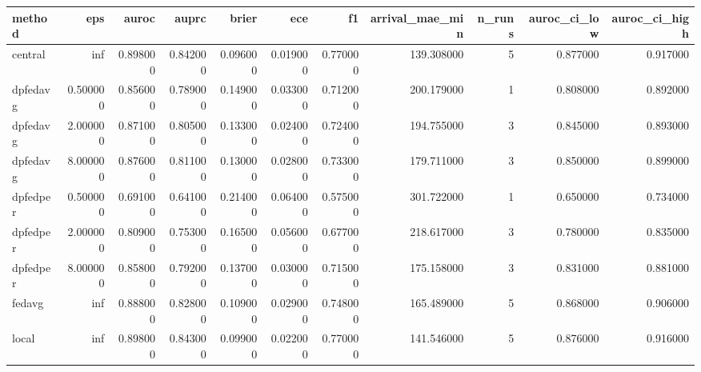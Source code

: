 \begin{tabular}{lrrrrrrrrrr}
\toprule
method & eps & auroc & auprc & brier & ece & f1 & arrival_mae_min & n_runs & auroc_ci_low & auroc_ci_high \\
\midrule
central & inf & 0.898000 & 0.842000 & 0.096000 & 0.019000 & 0.770000 & 139.308000 & 5 & 0.877000 & 0.917000 \\
dpfedavg & 0.500000 & 0.856000 & 0.789000 & 0.149000 & 0.033000 & 0.712000 & 200.179000 & 1 & 0.808000 & 0.892000 \\
dpfedavg & 2.000000 & 0.871000 & 0.805000 & 0.133000 & 0.024000 & 0.724000 & 194.755000 & 3 & 0.845000 & 0.893000 \\
dpfedavg & 8.000000 & 0.876000 & 0.811000 & 0.130000 & 0.028000 & 0.733000 & 179.711000 & 3 & 0.850000 & 0.899000 \\
dpfedper & 0.500000 & 0.691000 & 0.641000 & 0.214000 & 0.064000 & 0.575000 & 301.722000 & 1 & 0.650000 & 0.734000 \\
dpfedper & 2.000000 & 0.809000 & 0.753000 & 0.165000 & 0.056000 & 0.677000 & 218.617000 & 3 & 0.780000 & 0.835000 \\
dpfedper & 8.000000 & 0.858000 & 0.792000 & 0.137000 & 0.030000 & 0.715000 & 175.158000 & 3 & 0.831000 & 0.881000 \\
fedavg & inf & 0.888000 & 0.828000 & 0.109000 & 0.029000 & 0.748000 & 165.489000 & 5 & 0.868000 & 0.906000 \\
local & inf & 0.898000 & 0.843000 & 0.099000 & 0.022000 & 0.770000 & 141.546000 & 5 & 0.876000 & 0.916000 \\
\bottomrule
\end{tabular}
